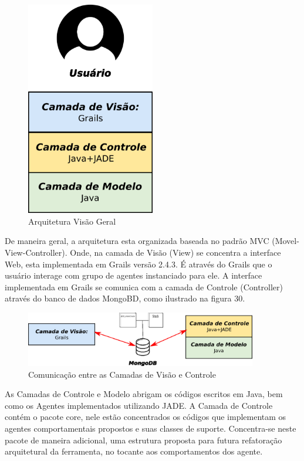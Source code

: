 \begin{figure}[h]
\centering
\label{f29}
\includegraphics[width=0.5\textwidth]{figuras/arquiteturaVisaoGeral}
\caption{Arquitetura Visão Geral}
\end{figure}

De maneira geral, a arquitetura esta organizada baseada no padrão MVC (Movel-View-Controller). Onde, na camada de Visão (View) se concentra a interface Web, esta implementada em Grails versão 2.4.3. É através do Grails que o usuário interage com grupo de agentes instanciado para ele. A interface implementada em Grails se comunica com a camada de Controle (Controller) através do banco de dados MongoBD, como ilustrado na figura 30.  

\begin{figure}[h]
\centering
\label{f30}
\includegraphics[width=0.9\textwidth]{figuras/comunicacao2}
\caption{Comunicação entre as Camadas de Visão e Controle}
\end{figure}

As Camadas de Controle e Modelo abrigam os códigos escritos em Java, bem como os Agentes implementados utilizando JADE. A Camada de Controle contém o pacote core, nele estão concentrados os códigos que implementam os agentes comportamentais propostos e suas classes de suporte. Concentra-se neste pacote de maneira adicional, uma estrutura proposta para futura refatoração arquitetural da ferramenta, no tocante aos comportamentos dos agente.

